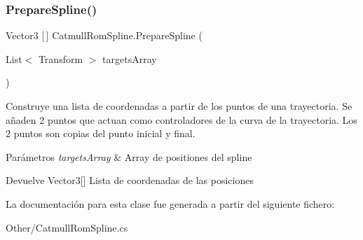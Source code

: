 \subsubsection{\texorpdfstring{PrepareSpline()}{PrepareSpline()}}
{\footnotesize\ttfamily Vector3 \mbox{[}$\,$\mbox{]} Catmull\+Rom\+Spline.\+Prepare\+Spline (\begin{DoxyParamCaption}\item[{List$<$ Transform $>$}]{targets\+Array }\end{DoxyParamCaption})\hspace{0.3cm}{\ttfamily [inline]}}

Construye una lista de coordenadas a partir de los puntos de una trayectoria. Se añaden 2 puntos que actuan como controladores de la curva de la trayectoria. Los 2 puntos son copias del punto inicial y final. 
\begin{DoxyParams}{Parámetros}
{\em targets\+Array} & Array de positiones del spline \\
\hline
\end{DoxyParams}
\begin{DoxyReturn}{Devuelve}
Vector3\mbox{[}\mbox{]} Lista de coordenadas de las posiciones 
\end{DoxyReturn}


La documentación para esta clase fue generada a partir del siguiente fichero\+:\begin{DoxyCompactItemize}
\item 
Other/Catmull\+Rom\+Spline.\+cs\end{DoxyCompactItemize}
